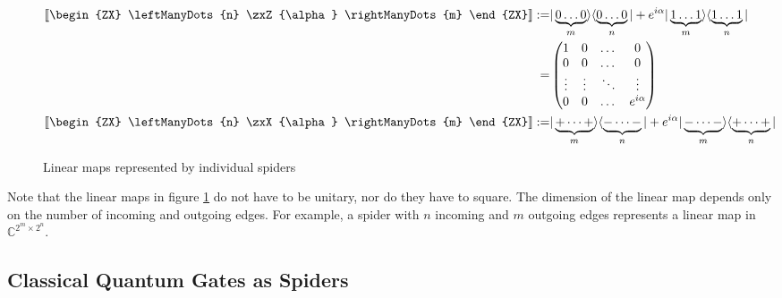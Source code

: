 \begin{figure}[h]
    \begin{align*}
        \left \llbracket
        \begin{ZX}
            \leftManyDots{n}  \zxZ{\alpha} \rightManyDots{m}
        \end{ZX}
        \right \rrbracket
        := & |\underbrace{0\dots 0}_{m}\rangle \langle \underbrace{0\dots0}_{n}| + e^{i\alpha}|\underbrace{1\dots1}_{m}\rangle \langle \underbrace{1\dots1}_{n}|
        \\
        =  & \begin{pmatrix}
                 1      & 0      & \dots  & 0           \\
                 0      & 0      & \dots  & 0           \\
                 \vdots & \vdots & \ddots & \vdots      \\
                 0      & 0      & \dots  & e^{i\alpha} \\
             \end{pmatrix}
        \\
        \left \llbracket
        \begin{ZX}
            \leftManyDots{n}  \zxX{\alpha} \rightManyDots{m}
        \end{ZX}
        \right \rrbracket
        := & |\underbrace{+ \dots +}_{m}\rangle \langle \underbrace{- \dots -}_{n}| + e^{i\alpha}|\underbrace{- \dots -}_{m}\rangle \langle \underbrace{+ \dots +}_{n}|
        \\
    \end{align*}
    \caption{Linear maps represented by individual spiders}
    \label{fig:individual-spiders-linear-maps}
\end{figure}

Note that the linear maps in figure \ref{fig:individual-spiders-linear-maps} do not have to be unitary, nor do they have to square. The dimension of the linear map depends only on the number of incoming and outgoing edges. For example, a spider with $n$ incoming and $m$ outgoing edges represents a linear map in $\mathbb{C}^{2^m \times 2^n}$.


\subsection{Classical Quantum Gates as Spiders}


